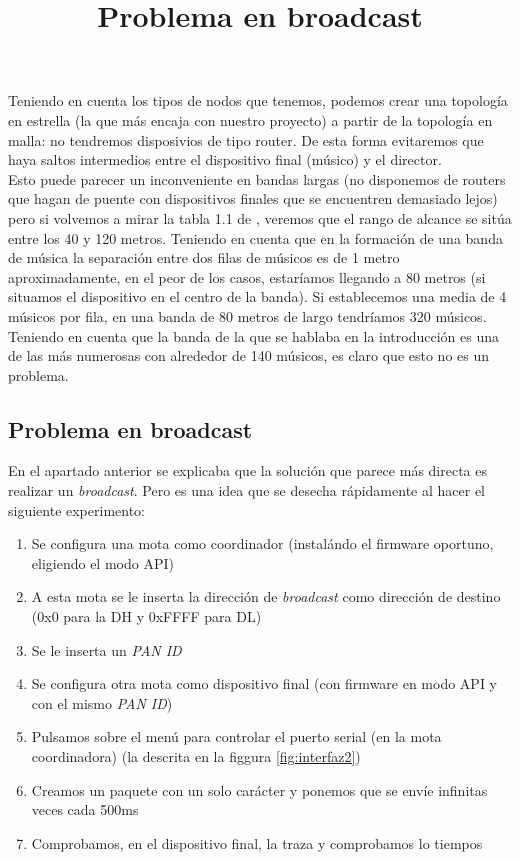 Teniendo en cuenta los tipos de nodos que tenemos, podemos crear una topología en estrella
(la que más encaja con nuestro proyecto) a partir de la topología en malla: no tendremos
disposivios de tipo router. De esta forma evitaremos que haya saltos intermedios entre
el dispositivo final (músico) y el director.\\

Esto puede parecer un inconveniente en bandas largas (no disponemos de routers
que hagan de puente con dispositivos finales que se encuentren demasiado lejos)
pero si volvemos a mirar la tabla 1.1 de \cite{faludi}, veremos que el rango
de alcance se sitúa entre los 40 y 120 metros. Teniendo en cuenta que en la
formación de una banda de música la separación entre dos filas de músicos es de
1 metro aproximadamente, en el peor de los casos, estaríamos llegando a 80 metros
(si situamos el dispositivo en el centro de la banda). Si establecemos una media de
4 músicos por fila, en una banda de 80 metros de largo tendríamos 320 músicos.
Teniendo en cuenta que la banda de la que se hablaba en la introducción \cite{cigarreras}
es una de las más numerosas con alrededor de 140 músicos, es claro que esto no es
un problema.\\

\subsection{Problema en broadcast}
\title{Problema en broadcast}
\label{subsec:problemabroadcast}

En el apartado anterior se explicaba que la solución que parece más directa es realizar
un \textit{broadcast}. Pero es una idea que se desecha rápidamente al hacer el siguiente experimento:

\begin{enumerate}
  \item Se configura una mota como coordinador (instalándo el firmware oportuno, eligiendo el modo API)
  \item A esta mota se le inserta la dirección de \textit{broadcast} como
  dirección de destino (0x0 para la DH y 0xFFFF para DL)
  \item Se le inserta un \textit{PAN ID}
  \item Se configura otra mota como dispositivo final (con firmware en modo API
  y con el mismo \textit{PAN ID})
  \item Pulsamos sobre el menú para controlar el puerto serial (en la mota coordinadora)
  (la descrita en la figgura \ref{fig:interfaz2})
  \item Creamos un paquete con un solo carácter y ponemos que se envíe infinitas veces
  cada 500ms
  \item Comprobamos, en el dispositivo final, la traza y comprobamos lo tiempos
\end{enumerate}

